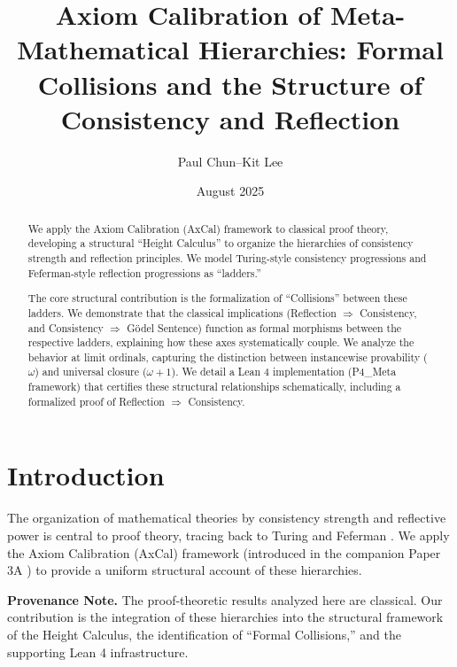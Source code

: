 \documentclass[11pt]{article}
\title{Axiom Calibration of Meta-Mathematical Hierarchies: Formal Collisions and the Structure of Consistency and Reflection}
\author{Paul Chun--Kit Lee}
\date{August 2025}
\begin{document}
\maketitle

\begin{abstract}
We apply the Axiom Calibration (AxCal) framework to classical proof theory, developing a structural ``Height Calculus'' to organize the hierarchies of consistency strength and reflection principles. We model Turing-style consistency progressions and Feferman-style reflection progressions as ``ladders.''

The core structural contribution is the formalization of ``Collisions'' between these ladders. We demonstrate that the classical implications (Reflection $\Rightarrow$ Consistency, and Consistency $\Rightarrow$ Gödel Sentence) function as formal morphisms between the respective ladders, explaining how these axes systematically couple. We analyze the behavior at limit ordinals, capturing the distinction between instancewise provability ($\omega$) and universal closure ($\omega+1$). We detail a Lean 4 implementation (P4\_Meta framework) that certifies these structural relationships schematically, including a formalized proof of Reflection $\Rightarrow$ Consistency.
\end{abstract}

\tableofcontents

\section{Introduction}
The organization of mathematical theories by consistency strength and reflective power is central to proof theory, tracing back to Turing \cite{Turing1939} and Feferman \cite{Feferman1962}. We apply the Axiom Calibration (AxCal) framework (introduced in the companion Paper 3A \cite{Paper3a}) to provide a uniform structural account of these hierarchies.

\begin{mdframed}[style=provenance]
\textbf{Provenance Note.} The proof-theoretic results analyzed here are classical. Our contribution is the integration of these hierarchies into the structural framework of the Height Calculus, the identification of ``Formal Collisions,'' and the supporting Lean 4 infrastructure.
\end{mdframed}

\end{document}
